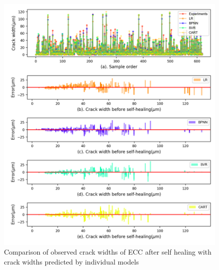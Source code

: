 \documentclass[11pt]{article}
\begin{document}
		\begin{figure}[!h]
		\centering
		\includegraphics[width=\textwidth]{error.png}
		\caption{Comparison of observed crack widths of ECC after self healing with crack widths predicted by  individual models}
		\label{error1}
	\end{figure}
	
\end{document}

